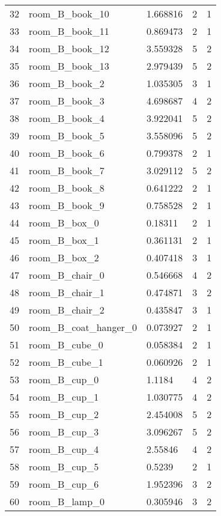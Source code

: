 \begin{longtable}{@{\zz\extracolsep{\fill}} l|llll}
32 & room\_B\_book\_10        & 1.668816 & 2 & 1 \\
33 & room\_B\_book\_11        & 0.869473 & 2 & 1 \\
34 & room\_B\_book\_12        & 3.559328 & 5 & 2 \\
35 & room\_B\_book\_13        & 2.979439 & 5 & 2 \\
36 & room\_B\_book\_2         & 1.035305 & 3 & 1 \\
37 & room\_B\_book\_3         & 4.698687 & 4 & 2 \\
38 & room\_B\_book\_4         & 3.922041 & 5 & 2 \\
39 & room\_B\_book\_5         & 3.558096 & 5 & 2 \\
40 & room\_B\_book\_6         & 0.799378 & 2 & 1 \\
41 & room\_B\_book\_7         & 3.029112 & 5 & 2 \\
42 & room\_B\_book\_8         & 0.641222 & 2 & 1 \\
43 & room\_B\_book\_9         & 0.758528 & 2 & 1 \\
44 & room\_B\_box\_0          & 0.18311  & 2 & 1 \\
45 & room\_B\_box\_1          & 0.361131 & 2 & 1 \\
46 & room\_B\_box\_2          & 0.407418 & 3 & 1 \\
47 & room\_B\_chair\_0        & 0.546668 & 4 & 2 \\
48 & room\_B\_chair\_1        & 0.474871 & 3 & 2 \\
49 & room\_B\_chair\_2        & 0.435847 & 3 & 1 \\
50 & room\_B\_coat\_hanger\_0 & 0.073927 & 2 & 1 \\
51 & room\_B\_cube\_0         & 0.058384 & 2 & 1 \\
52 & room\_B\_cube\_1         & 0.060926 & 2 & 1 \\
53 & room\_B\_cup\_0          & 1.1184   & 4 & 2 \\
54 & room\_B\_cup\_1          & 1.030775 & 4 & 2 \\
55 & room\_B\_cup\_2          & 2.454008 & 5 & 2 \\
56 & room\_B\_cup\_3          & 3.096267 & 5 & 2 \\
57 & room\_B\_cup\_4          & 2.55846  & 4 & 2 \\
58 & room\_B\_cup\_5          & 0.5239   & 2 & 1 \\
59 & room\_B\_cup\_6          & 1.952396 & 3 & 2 \\
60 & room\_B\_lamp\_0         & 0.305946 & 3 & 2 \\

\end{longtable}
